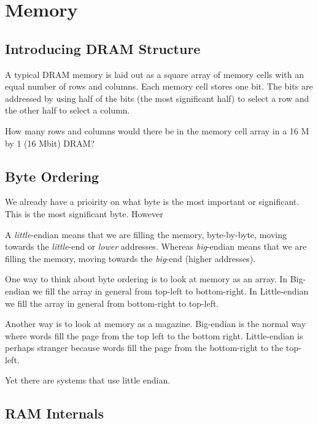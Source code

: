 

\chapter{Memory}


\section{Introducing DRAM Structure}


A typical DRAM memory is laid out as a square
array of memory cells with an equal number of rows
and columns. Each memory cell stores one bit. The
bits are addressed by using half of the bits (the most
signiﬁcant half) to select a row and the other half to
select a column.

\begin{example}

How many rows and columns would there be
in the memory cell array in a 16 M by 1 (16 Mbit) DRAM?

\end{example} 


\section{Byte Ordering}

We already have a prioirity on what byte is the most important 
or significant. This is the most significant byte. However 


A \textit{little}-endian means that we are filling the memory, 
byte-by-byte, moving towards the \textit{little}-end or \textit{lower} addresses.
Whereas \textit{big}-endian means that we are filling the memory, 
moving towards the \textit{big}-end (higher addresses).



\begin{example}
One way to think about byte ordering is to look at memory as an array. 
In Big-endian we fill the array in general from top-left to bottom-right. 
In Little-endian we fill the array in general from bottom-right to top-left. 
\end{example}

\begin{example}
Another way is to look at memory as a magazine. 
Big-endian is the normal way where words fill the page 
from the top left to the bottom right. Little-endian is 
perhaps stranger because words fill the page from the 
bottom-right to the top-left.
\end{example}


Yet there are systems that use little endian. %



\section{RAM Internals}



